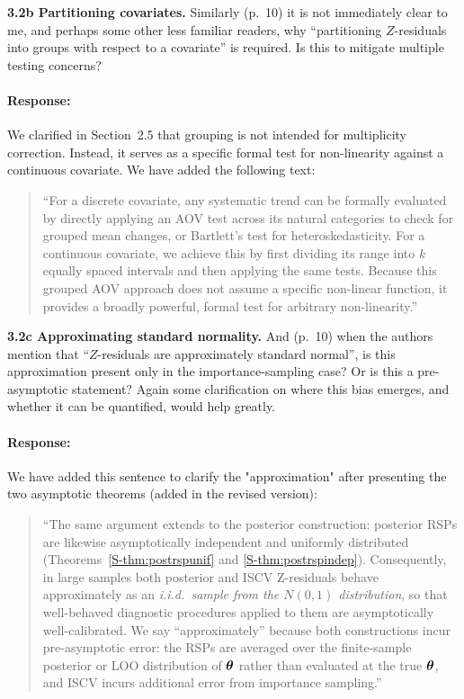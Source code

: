 \documentclass[11pt]{article}
\newcommand*{\mybox}[2]{%
  \par\medskip\noindent
  \colorbox{#1!30}{\parbox{.98\linewidth}{#2}}%
  \par\medskip
}
\begin{document}

\mybox{gray}{\textbf{3.2b Partitioning covariates.} Similarly (p.~10) it is not immediately clear to me, and perhaps some other less familiar readers, why ``partitioning $Z$-residuals into groups with respect to a covariate'' is required. Is this to mitigate multiple testing concerns?}

\paragraph{Response:}

We clarified in Section~2.5 that grouping is not intended for multiplicity correction. Instead, it serves as a specific formal test for non-linearity against a continuous covariate. We have added the following text:

\begin{quote}

``For a discrete covariate, any systematic trend can be formally evaluated by directly applying an AOV test across its natural categories to check for grouped mean changes, or Bartlett's test for heteroskedasticity. For a continuous covariate, we achieve this by first dividing its range into $k$ equally spaced intervals and then applying the same tests. Because this grouped AOV approach does not assume a specific non-linear function, it provides a broadly powerful, formal test for arbitrary non-linearity.''
\end{quote}


\mybox{gray}{\textbf{3.2c Approximating standard normality.} And (p.~10) when the authors mention that ``$Z$-residuals are approximately standard normal'', is this approximation present only in the importance-sampling case? Or is this a pre-asymptotic statement? Again some clarification on where this bias emerges, and whether it can be quantified, would help greatly.}

\paragraph{Response:}
We have added this sentence to clarify the "approximation" after presenting the two asymptotic theorems (added in the revised version):

\begin{quote}
``The same argument extends to the posterior construction: posterior RSPs are
likewise asymptotically independent and uniformly distributed
(Theorems~\ref{S-thm:postrspunif} and \ref{S-thm:postrspindep}).
Consequently, in large samples both posterior and ISCV Z-residuals behave
approximately as an \emph{i.i.d.\ sample from the $N(0,1)$ distribution},
so that well-behaved diagnostic procedures applied to them are
asymptotically well-calibrated. We say ``approximately'' because
both constructions incur pre-asymptotic error: the RSPs are averaged over
the finite-sample posterior or LOO distribution of $\bm{\theta}$ rather than
evaluated at the true $\bm{\theta}$, and ISCV incurs additional error from
importance sampling.''
\end{quote}
\end{document}
